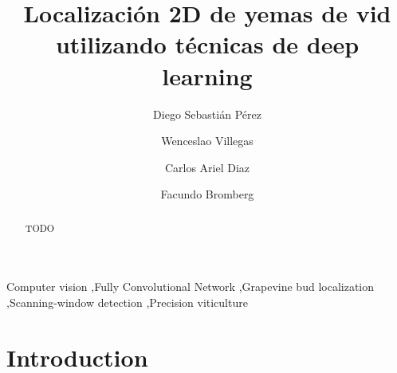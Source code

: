 \documentclass[a4paper,authoryear,review]{elsarticle}
\begin{document}
\begin{frontmatter}

\title{Localización 2D de yemas de vid utilizando técnicas de deep learning}

\author[utn,uncuyo]{Diego Sebastián Pérez}

\author[utn]{Wenceslao Villegas}

\author[utn]{Carlos Ariel Diaz}

\author[conicet]{Facundo Bromberg}

\address[utn]{Universidad Tecnológica Nacional, Facultad Regional Mendoza, Laboratorio de Inteligencia Artificial DHARMa, Dpto. de Sistemas de la Información. Rodríguez 273, CP 5500, Mendoza, Argentina.}

\address[uncuyo]{Universidad Nacional de Cuyo, Instituto universitario para las Tecnologías de la Información y las Comunicaciones, CONICET. Padre Jorge Contreras 1300, CP 5500, Mendoza, Argentina.}

\address[conicet]{Universidad Tecnológica Nacional, Facultad Regional Mendoza, CONICET, Laboratorio de Inteligencia Artificial DHARMa, Dpto. de Sistemas de la Información. Rodríguez 273, CP 5500, Mendoza, Argentina.}


\begin{abstract}
TODO
\end{abstract}

\begin{keyword}
Computer vision \sep Fully Convolutional Network \sep Grapevine bud localization \sep Scanning-window detection \sep Precision viticulture
\end{keyword}

\end{frontmatter}

\linenumbers

\section{Introduction} 
\end{document}
